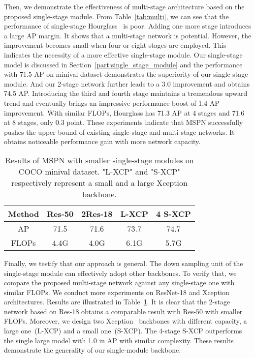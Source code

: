 \documentclass[10pt,twocolumn,letterpaper]{article}
\begin{document}
Then, we demonstrate the effectiveness of multi-stage architecture based on the proposed single-stage module. From Table~\ref{tab:multi}, we can see that the performance of single-stage Hourglass~\cite{newell2016stacked} is poor. Adding one more stage introduces a large AP margin. It shows that a multi-stage network is potential. However, the improvement becomes small when four or eight stages are employed. This indicates the necessity of a more effective single-stage module. Our single-stage model is discussed in Section~\ref{part:single_stage_module} and the performance with 71.5 AP on minival dataset demonstrates the superiority of our single-stage module. And our 2-stage network further leads to a 3.0 improvement and obtains 74.5 AP. Introducing the third and fourth stage maintains a tremendous upward trend and eventually brings an impressive performance boost of 1.4 AP improvement. With similar FLOPs, Hourglass has 71.3 AP at 4 stages and 71.6 at 8 stages, only 0.3 point. These experiments indicate that MSPN successfully pushes the upper bound of existing single-stage and multi-stage networks. It obtains noticeable performance gain with more network capacity.

\begin{table}[h]
	\begin{spacing}{1.1}
		\begin{center}
			\begin{tabular}{c|c c|c c}
				\hline
				Method & Res-50 & 2Res-18 & L-XCP & 4 S-XCP \\
				\hline
				AP & 71.5 & 71.6 & 73.7 & 74.7\\
				FLOPs & 4.4G & 4.0G & 6.1G & 5.7G\\
				\hline
			\end{tabular}
		\end{center}
		\caption{Results of MSPN with smaller single-stage modules on COCO minival dataset. "L-XCP" and "S-XCP" respectively represent a small and a large Xception backbone.}
		\label{tab:small}
	\end{spacing}
\end{table}

Finally, we testify that our approach is general. The down sampling unit of the single-stage module can effectively adopt other backbones. To verify that, we compare the proposed multi-stage network against any single-stage one with similar FLOPs. We conduct more experiments on ResNet-18 and Xception~\cite{chollet2017xception} architectures. Results are illustrated in Table~\ref{tab:small}. It is clear that the 2-stage network based on Res-18 obtains a comparable result with Res-50 with smaller FLOPs. Moreover, we design two Xception~\cite{chollet2017xception} backbones with different capacity, a large one~(L-XCP) and a small one~(S-XCP). The 4-stage S-XCP outperforms the single large model with 1.0 in AP with similar complexity. These results demonstrate the generality of our single-module backbone. 
\end{document}
